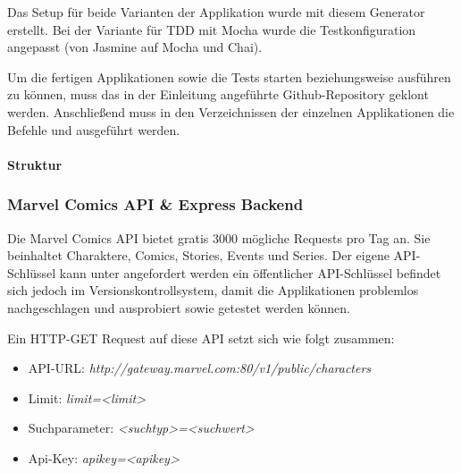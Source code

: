 Das Setup für beide Varianten der Applikation wurde mit diesem Generator erstellt. Bei der Variante für TDD mit Mocha wurde die Testkonfiguration angepasst (von Jasmine auf Mocha und Chai).

Um die fertigen Applikationen sowie die Tests starten beziehungsweise ausführen zu können, muss das in der Einleitung angeführte Github-Repository geklont werden. Anschließend muss in den Verzeichnissen der einzelnen Applikationen die Befehle  und  ausgeführt werden.

\newpage
\paragraph{Struktur}

\subsubsection{Marvel Comics API \& Express Backend}
Die Marvel Comics API bietet gratis 3000 mögliche Requests pro Tag an. Sie beinhaltet Charaktere, Comics, Stories, Events und Series. Der eigene API-Schlüssel kann unter  angefordert werden ein öffentlicher API-Schlüssel befindet sich jedoch im Versionskontrollsystem, damit die Applikationen problemlos nachgeschlagen und ausprobiert sowie getestet werden können.

Ein HTTP-GET Request auf diese API setzt sich wie folgt zusammen:
\begin{itemize}
  \item API-URL: \textit{http://gateway.marvel.com:80/v1/public/characters}
  \item Limit: \textit{limit=<limit>}
  \item Suchparameter: \textit{<suchtyp>=<suchwert>}
  \item Api-Key: \textit{apikey=<apikey>}
\end{itemize}

